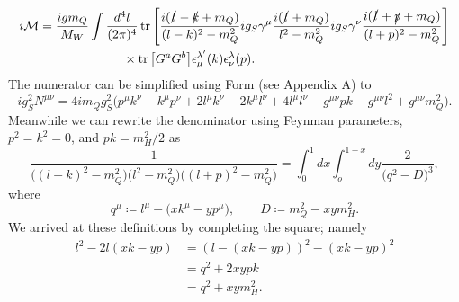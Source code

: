 \begin{equation}\begin{aligned}
  i\mathcal{M}&=\frac{igm_Q}{M_W}\int\frac{d^4l}{(2\pi)^4}\tr\left[
        \frac{i(\slashed{l}-\slashed{k}+m_Q)}{(l-k)^2-m_Q^2}ig_S\gamma^\mu
        \frac{i(\slashed{l}+m_Q)}{l^2-m_Q^2}ig_S\gamma^\nu
        \frac{i(\slashed{l}+\slashed{p}+m_Q)}{(l+p)^2-m_Q^2}\right] \\
        &~~~~~~~~~~~~~~~~~~~~\times\tr\big[G^aG^b\big]\epsilon^{\lambda '}_\mu(k)
                           \epsilon^{\lambda }_\nu(p).
\end{aligned}\end{equation}
The numerator can be simplified using Form (see Appendix A) to
\begin{equation}
  \label{eq:3num}
  ig_S^2N^{\mu\nu}=4im_Qg_S^2\big(p^\mu k^\nu-k^\mu p^\nu+2l^\mu k^\nu
                     -2k^\mu l^\nu+4l^\mu l^\nu-g^{\mu\nu}pk-g^{\mu\nu}l^2
                     +g^{\mu\nu}m_Q^2\big).
\end{equation}
Meanwhile we can rewrite the denominator using Feynman parameters, $p^2=k^2=0$,
and $pk=m_H^2/2$ as
\begin{equation}
  \frac{1}{\big((l-k)^2-m_Q^2\big)\big(l^2-m_Q^2\big)\big((l+p)^2-m_Q^2\big)}
    =\int_0^1dx\int_o^{1-x}dy\frac{2}{\big(q^2-D\big)^3},
\end{equation}
where
\begin{equation}
  q^\mu\coloneqq l^\mu-\big(xk^\mu-yp^\mu\big),\qquad D\coloneqq m_Q^2-xym_H^2.
\end{equation}
We arrived at these definitions by completing the square; namely
\begin{equation}
  \begin{aligned}
    l^2-2l(xk-yp)&=(l-(xk-yp))^2-(xk-yp)^2 \\
                 &=q^2+2xypk \\
                 &=q^2+xym_H^2.
  \end{aligned}
\end{equation}

